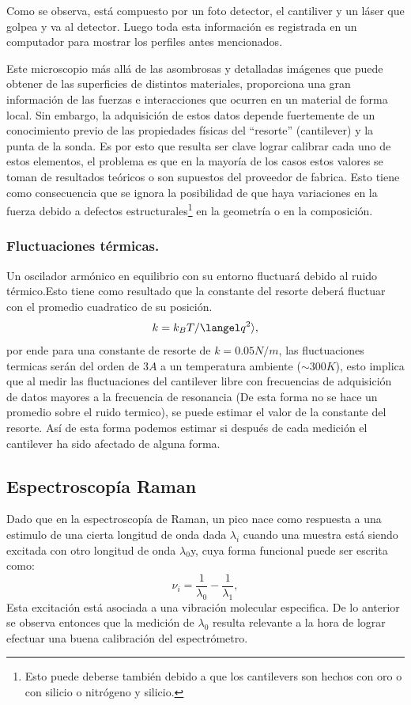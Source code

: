\documentclass{article}
\begin{document}
Como se observa, está compuesto por un foto detector, el cantiliver y un láser que golpea y va al detector. Luego toda esta información es registrada en un computador para mostrar los perfiles antes mencionados.

 Este microscopio más allá de las asombrosas y detalladas imágenes que puede obtener de las superficies de distintos materiales, proporciona una gran información de las fuerzas e interacciones que ocurren en un material de forma local. Sin embargo, la adquisición de estos datos depende fuertemente de un conocimiento previo de las propiedades físicas del ``resorte'' (cantilever) y la punta de la sonda. Es por esto que resulta ser clave lograr calibrar cada uno de estos elementos, el problema es que en la mayoría de los casos estos valores se toman de resultados teóricos o son supuestos del proveedor de fabrica. Esto tiene como consecuencia que se ignora la posibilidad de que haya variaciones en la fuerza debido a defectos estructurales\footnote{Esto puede deberse también debido a que los cantilevers son hechos con oro o con silicio o nitrógeno y silicio.} en la geometría o en la composición.
 \subsubsection{Fluctuaciones térmicas.}
 Un oscilador armónico en equilibrio con su entorno fluctuará debido al ruido térmico.Esto tiene como resultado que la constante del resorte deberá fluctuar con el promedio cuadratico de su posición.
 \[k=k_{B}T/\langel q^2\rangle,\]
 por ende para una constante de resorte de $k=0.05N/m$, las fluctuaciones termicas serán del orden de $3A$ a un temperatura ambiente ($\sim 300 K$), esto implica que al medir las fluctuaciones del cantilever libre con frecuencias de adquisición de datos mayores a la frecuencia de resonancia (De esta forma no se hace un promedio sobre el ruido termico), se puede estimar el valor de la constante del resorte. Así de esta forma podemos estimar si después de cada medición el cantilever ha sido afectado de alguna forma.
\subsection{Espectroscopía Raman}
Dado que en la espectroscopía de Raman, un pico nace como respuesta a una estimulo de una cierta longitud de onda dada $\lambda_i$ cuando una muestra está siendo excitada con otro longitud de onda $\lambda_0$y, cuya forma funcional puede ser escrita como:
\[\nu_{i}=\frac{1}{\lambda_0}-\frac{1}{\lambda_1},\]
Esta excitación está asociada a una vibración molecular especifica.
 De lo anterior se observa entonces que la medición de $\lambda_0$ resulta relevante a la hora de lograr efectuar una buena calibración del espectrómetro.
\end{document}
